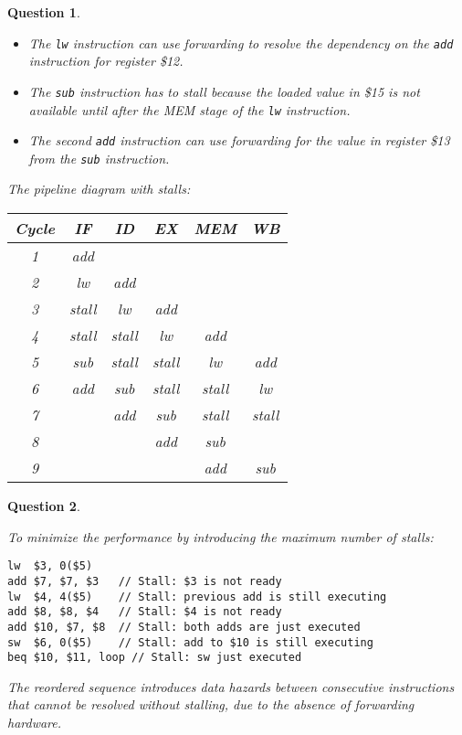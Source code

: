 \documentclass{article}
\theoremstyle{questionstyle}
\newtheorem{q}{Question}
\begin{document}
\begin{q}\begin{enumerate} \leavevmode
\begin{itemize}
  \item The \texttt{lw} instruction can use forwarding to resolve the dependency on the \texttt{add} instruction for register \$12.
  \item The \texttt{sub} instruction has to stall because the loaded value in \$15 is not available until after the MEM stage of the \texttt{lw} instruction.
  \item The second \texttt{add} instruction can use forwarding for the value in register \$13 from the \texttt{sub} instruction.
\end{itemize}

The pipeline diagram with stalls:

\begin{center}
\begin{tabular}{|c|c|c|c|c|c|}
\hline
Cycle & IF & ID & EX & MEM & WB \\
\hline
1 & add &  &  &  &  \\
2 & lw & add &  &  &  \\
3 & stall & lw & add &  &  \\
4 & stall & stall & lw & add &  \\
5 & sub & stall & stall & lw & add \\
6 & add & sub & stall & stall & lw \\
7 &  & add & sub & stall & stall \\
8 &  &  & add & sub &  \\
9 &  &  &  & add & sub \\
\hline
\end{tabular}
\end{center}
\end{enumerate}\end{q}

\newpage
\begin{q}\begin{enumerate} \leavevmode
To minimize the performance by introducing the maximum number of stalls:
\begin{verbatim}
lw  $3, 0($5)
add $7, $7, $3   // Stall: $3 is not ready
lw  $4, 4($5)    // Stall: previous add is still executing
add $8, $8, $4   // Stall: $4 is not ready
add $10, $7, $8  // Stall: both adds are just executed
sw  $6, 0($5)    // Stall: add to $10 is still executing
beq $10, $11, loop // Stall: sw just executed
\end{verbatim}

The reordered sequence introduces data hazards between consecutive instructions that cannot be resolved without stalling, due to the absence of forwarding hardware.
\end{enumerate}\end{q}
\end{document}
